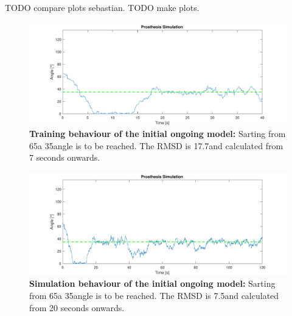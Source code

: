 TODO compare plots sebastian. TODO make plots. 
\begin{figure}[tb]
	\centering
	\includegraphics[width=0.7\linewidth]{figures/OngoingModel/InitialModelTrain-movement(start65-target35)RMSD=17,70511.pdf}
	\caption[Training behaviour of the initial ongoing model]{\textbf{Training behaviour of the initial ongoing model:} Sarting from 65\degree a 35\degree angle is to be reached. The RMSD is 17.7\degree and calculated from 7 seconds onwards. }
	\label{fig:initialmodeltrain}
\end{figure}

\begin{figure}[tb]
	\centering
	\includegraphics[width=0.7\linewidth]{figures/OngoingModel/InitialModelSim-movement(start65-target35)RMSD=7,56571}
	\caption[Simulation behaviour of the initial ongoing model]{\textbf{Simulation behaviour of the initial ongoing model:} Sarting from 65\degree a 35\degree angle is to be reached. The RMSD is 7.5\degree and calculated from 20 seconds onwards. }
	\label{fig:initialmodelsim}
\end{figure}



